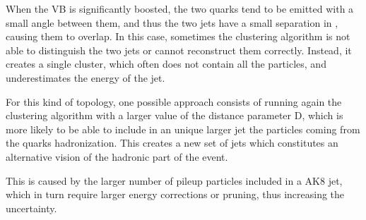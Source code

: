 When the VB is significantly boosted, the two quarks tend to be emitted with a small angle between them,
and thus the two jets have a small separation in \DR, causing them to overlap.
In this case, sometimes the clustering algorithm is not able to distinguish the two jets or cannot reconstruct them correctly.
Instead, it creates a single cluster, which often does not contain all the particles, and underestimates the energy of the jet.

For this kind of topology, one possible approach consists of running again the clustering algorithm with a larger value of the distance parameter D,
which is more likely to be able to include in an unique larger jet the particles coming from the quarks hadronization.
This creates a new set of jets which constitutes an alternative vision of the hadronic part of the event.

This is caused by the larger number of pileup particles included in a AK8 jet, which in turn require larger energy corrections or pruning, thus increasing the uncertainty.
